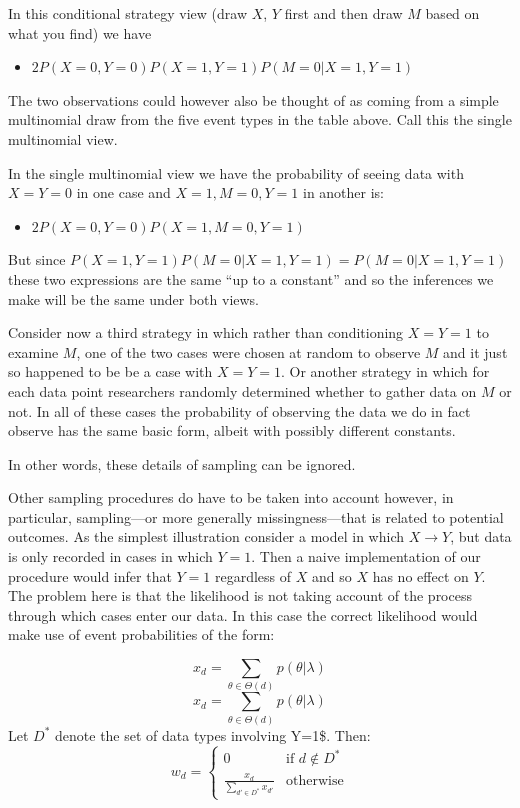 \documentclass[
  12pt,
]{book}
\providecommand{\tightlist}{%
  \setlength{\itemsep}{0pt}\setlength{\parskip}{0pt}}
\begin{document}
In this conditional strategy view (draw \(X\), \(Y\) first and then draw \(M\) based on what you find) we have

\begin{itemize}
\tightlist
\item
  \(2P(X=0, Y=0)P(X=1, Y=1)P(M=0 | X=1, Y=1)\)
\end{itemize}

The two observations could however also be thought of as coming from a simple multinomial draw from the five event types in the table above. Call this the single multinomial view.

In the single multinomial view we have the probability of seeing data with \(X=Y=0\) in one case and \(X=1, M=0, Y=1\) in another is:

\begin{itemize}
\tightlist
\item
  \(2P(X=0, Y=0)P(X=1, M=0, Y=1)\)
\end{itemize}

But since \(P(X=1, Y=1)P(M=0 | X=1, Y=1) = P(M=0 | X=1, Y=1)\) these two expressions are the same ``up to a constant'' and so the inferences we make will be the same under both views.

Consider now a third strategy in which rather than conditioning \(X=Y=1\) to examine \(M\), one of the two cases were chosen at random to observe \(M\) and it just so happened to be be a case with \(X=Y=1\). Or another strategy in which for each data point researchers randomly determined whether to gather data on \(M\) or not. In all of these cases the probability of observing the data we do in fact observe has the same basic form, albeit with possibly different constants.

In other words, these details of sampling can be ignored.

Other sampling procedures do have to be taken into account however, in particular, sampling---or more generally missingness---that is related to potential outcomes. As the simplest illustration consider a model in which \(X \rightarrow Y\), but data is only recorded in cases in which \(Y=1\). Then a naive implementation of our procedure would infer that \(Y=1\) regardless of \(X\) and so \(X\) has no effect on \(Y\). The problem here is that the likelihood is not taking account of the process through which cases enter our data. In this case the correct likelihood would make use of event probabilities of the form:

\[x_d = \sum_{\theta \in \Theta(d)}p(\theta|\lambda)\]
\[x_d = \sum_{\theta \in \Theta(d)}p(\theta|\lambda)\]
Let \(D^*\) denote the set of data types involving Y=1\$. Then:
\[w_d =  \left\{ \begin{array}{cc}
0 & \text{if } d\not\in D^* \\
\frac{x_d}{\sum_{d'\in D^*}x_{d'}} & \text{otherwise} \end{array} \right.\]
\end{document}

